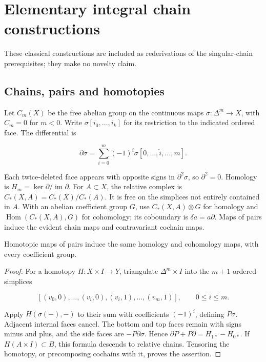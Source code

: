 \section{Elementary integral chain constructions}
\label{mapsI:chain:section}

These classical constructions are included as rederivations of the singular-chain prerequisites; they make no novelty claim.

\subsection{Chains, pairs and homotopies}
\label{mapsI:chain:section-1}

Let \(C_m(X)\) be the free abelian group on the continuous maps \(\sigma:\Delta^m\to X\), with \(C_m=0\) for \(m<0\). Write \(\sigma[i_0,\ldots,i_k]\) for its restriction to the indicated ordered face. The differential is

\[
\partial\sigma=\sum_{i=0}^m(-1)^i\sigma[0,\ldots,\widehat i,\ldots,m].
\]

Each twice-deleted face appears with opposite signs in \(\partial^2\sigma\), so \(\partial^2=0\). Homology is \(H_m=\ker\partial/\operatorname{im}\partial\). For \(A\subset X\), the relative complex is \(C_*(X,A)=C_*(X)/C_*(A)\). It is free on the simplices not entirely contained in \(A\). With an abelian coefficient group \(G\), use \(C_*(X,A)\otimes G\) for homology and \(\operatorname{Hom}(C_*(X,A),G)\) for cohomology; its coboundary is \(\delta a=a\partial\). Maps of pairs induce the evident chain maps and contravariant cochain maps.

\begin{lemma}
\label{mapsI:chain:lemma:1.1}
Homotopic maps of pairs induce the same homology and cohomology maps, with every coefficient group.
\end{lemma}

\begin{proof}
For a homotopy \(H:X\times I\to Y\), triangulate \(\Delta^m\times I\) into the \(m+1\) ordered simplices

\[
[(v_0,0),\ldots,(v_i,0),(v_i,1),\ldots,(v_m,1)],
\qquad 0\leq i\leq m.
\]

Apply \(H(\sigma(-),-)\) to their sum with coefficients \((-1)^i\), defining \(P\sigma\). Adjacent internal faces cancel. The bottom and top faces remain with signs minus and plus, and the side faces are \(-P\partial\sigma\). Hence
\(\partial P+P\partial=H_{1*}-H_{0*}\).
If \(H(A\times I)\subset B\), this formula descends to relative chains. Tensoring the homotopy, or precomposing cochains with it, proves the assertion.
\end{proof}

